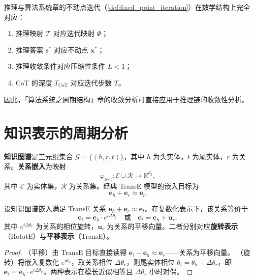 \begin{remark}[推理与不动点迭代的对应]\label{rem:reasoning_fixed_point_correspondence}
推理与算法系统章的不动点迭代（\cref{def:fixed_point_iteration}）在数学结构上完全对应：
\begin{enumerate}[label=(\roman*)]
    \item 推理映射 $\mathcal{T}$ 对应迭代映射 $\Phi$；
    \item 推理答案 $\mathbf{s}^*$ 对应不动点 $\mathbf{x}^*$；
    \item 推理收敛条件对应压缩性条件 $L<1$；
    \item CoT 的深度 $T_{\text{CoT}}$ 对应迭代步数 $T$。
\end{enumerate}
因此，「算法系统之周期结构」章的收敛分析可直接应用于推理链的收敛性分析。
\end{remark}

\section{知识表示的周期分析}
\label{sec:knowledge_periodicity}

\begin{definition}[知识图谱与关系嵌入]\label{def:knowledge_graph_embedding}
\textbf{知识图谱}是三元组集合 $\mathcal{G}=\{(h,r,t)\}$，其中 $h$ 为头实体，$t$ 为尾实体，$r$ 为关系。\textbf{关系嵌入}为映射
\[
\varphi_{\text{KG}}:\mathcal{E}\cup\mathcal{R}\to\mathbb{R}^{d_k},
\]
其中 $\mathcal{E}$ 为实体集，$\mathcal{R}$ 为关系集。经典 TransE 模型的嵌入目标为
\[
\mathbf{e}_h+\mathbf{e}_r\approx\mathbf{e}_t.
\]
\end{definition}

\begin{theorem}\label{thm:relation_translation_rotation}
设知识图谱嵌入满足 TransE 关系 $\mathbf{e}_h+\mathbf{e}_r\approx\mathbf{e}_t$。在复数化表示下，该关系等价于
\[
\mathbf{e}_t=\mathbf{e}_h\cdot e^{i\Delta\theta_r}\quad\text{或}\quad
\mathbf{e}_t=\mathbf{e}_h+\mathbf{u}_r,
\]
其中 $e^{i\Delta\theta_r}$ 为关系的相位旋转，$\mathbf{u}_r$ 为关系的平移向量。二者分别对应\textbf{旋转表示}（RotatE）与\textbf{平移表示}（TransE）。
\end{theorem}

\begin{proof}
（平移）由 TransE 目标直接读得 $\mathbf{e}_t-\mathbf{e}_h\approx\mathbf{e}_r$——关系为平移向量。
（旋转）将嵌入复数化 $e^{i\theta_h}$，取关系相位 $\Delta\theta_r$，则尾实体相位 $\theta_t=\theta_h+\Delta\theta_r$，即 $\mathbf{e}_t=\mathbf{e}_h\cdot e^{i\Delta\theta_r}$。两种表示在模长近似相等且 $\Delta\theta_r$ 小时对偶。
\end{proof}


